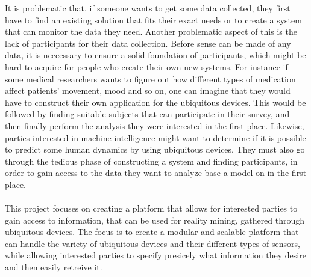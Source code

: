 It is problematic that, if someone wants to get some data collected, they first have to find an existing solution that fits their exact needs or to create a system that can monitor the data they need. Another problematic aspect of this is the lack of participants for their data collection. Before sense can be made of any data, it is neccessary to ensure a solid foundation of participants, which might be hard to acquire for people who create their own new systems. For instance if some medical researchers wants to figure out how different types of medication affect patients' movement, mood and so on, one can imagine that they would have to construct their own application for the ubiquitous devices. This would be followed by finding suitable subjects that can participate in their survey, and then finally perform the analysis they were interested in the first place. Likewise, parties interested in machine intelligence might want to determine if it is possible to predict some human dynamics by using ubiquitous devices. They must also go through the tedious phase of constructing a system and finding participants, in order to gain access to the data they want to analyze base a model on in the first place.
\\\\
This project focuses on creating a platform that allows for interested parties to gain access to information, that can be used for reality mining, gathered through ubiquitous devices. The focus is to create a modular and scalable platform that can handle the variety of ubiquitous devices and their different types of sensors, while allowing interested parties to specify presicely what information they desire and then easily retreive it.



